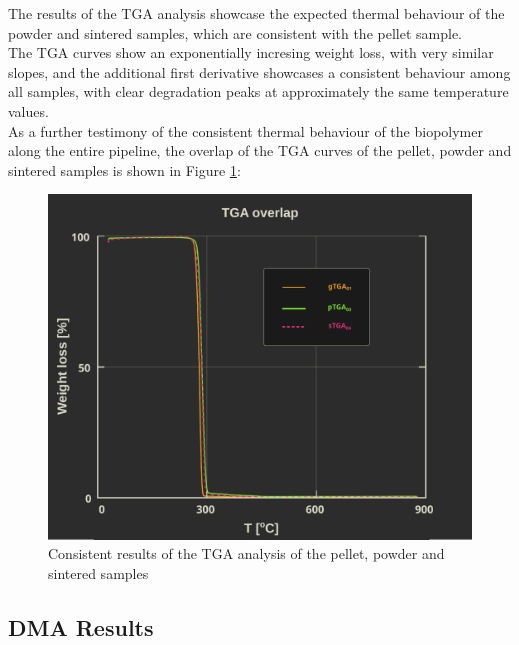 \documentclass{article}
\begin{document}
            \clearpage

            The results of the TGA analysis showcase the expected thermal behaviour of the powder and sintered samples,
            which are consistent with the pellet sample. \\ 

            The TGA curves show an exponentially incresing weight loss, with very similar slopes, and the additional 
            first derivative showcases a consistent behaviour among all samples, with clear degradation peaks at approximately 
            the same temperature values. \\ 

            As a further testimony of the consistent thermal behaviour of the biopolymer along the entire pipeline, the overlap of the
            TGA curves of the pellet, powder and sintered samples is shown in Figure \ref{fig:TGA_overlapped}:

                \begin{figure}[ht]
                    \centering
                    \includegraphics[width=\textwidth]{Pictures/Thermal_analysis_plots/TGA_catalogued/Fixed/TGA_overlapped.pdf}
                    \caption{Consistent results of the TGA analysis of the pellet, powder and sintered samples}
                    \label{fig:TGA_overlapped}
                \end{figure}

        \clearpage

        \subsection{DMA Results\label{DMA_Results}}
\end{document}
